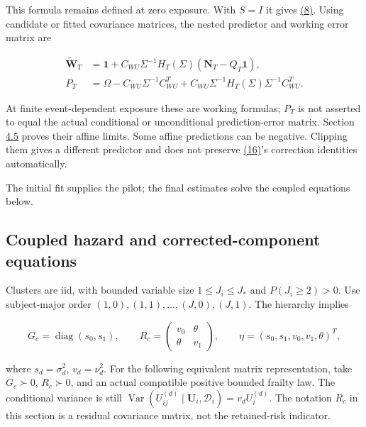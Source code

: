\documentclass[11pt]{article}
\begin{document}
This formula remains defined at zero exposure. With \(S=I\) it gives \hyperref[eq:8]{(8)}. Using candidate or fitted covariance matrices, the nested predictor and working error matrix are

\begin{equation*}
\begin{aligned}
\widetilde{\mathbf W}_T
&=\mathbf1+C_{WU}\Sigma^{-1}
 H_T(\Sigma)(\mathbf N_T-Q_T\mathbf1),\\
P_T&=\Omega-C_{WU}\Sigma^{-1}C_{WU}^T
 +C_{WU}\Sigma^{-1}H_T(\Sigma)\Sigma^{-1}C_{WU}^T .
\end{aligned}\tag{16}\label{eq:16}
\end{equation*}

At finite event-dependent exposure these are working formulas; \(P_T\) is not asserted to equal the actual conditional or unconditional prediction-error matrix. Section \hyperref[sec:4.5]{4.5} proves their affine limits. Some affine predictions can be negative. Clipping them gives a different predictor and does not preserve \hyperref[eq:16]{(16)}'s correction identities automatically.

The initial fit supplies the pilot; the final estimates solve the coupled equations below.

\subsection{Coupled hazard and corrected-component equations}\label{sec:3.4}

Clusters are iid, with bounded variable size \(1\leq J_i\leq J_*\) and \(P(J_i\geq2)>0\). Use subject-major order \((1,0),(1,1),\ldots,(J,0),(J,1)\). The hierarchy implies

\begin{equation*}
{G_c}=\operatorname{diag}(s_0,s_1),\qquad
{R_c}=\begin{pmatrix}v_0&\theta\\\theta&v_1\end{pmatrix},\qquad
\eta=(s_0,s_1,v_0,v_1,\theta)^T,
\tag{17}\label{eq:17}
\end{equation*}

where \(s_d=\sigma_d^2\), \(v_d=\nu_d^2\). For the following equivalent matrix representation, take \({G_c}\succ0\), \({R_c}\succ0\), and an actual compatible positive bounded frailty law. The conditional variance is still \(\operatorname{Var}(U_{ij}^{(d)}\mid\mathbf U_i,\mathcal D_i)=v_d U_i^{(d)}\). The notation \({R_c}\) in this section is a residual covariance matrix, not the retained-risk indicator.
\end{document}
